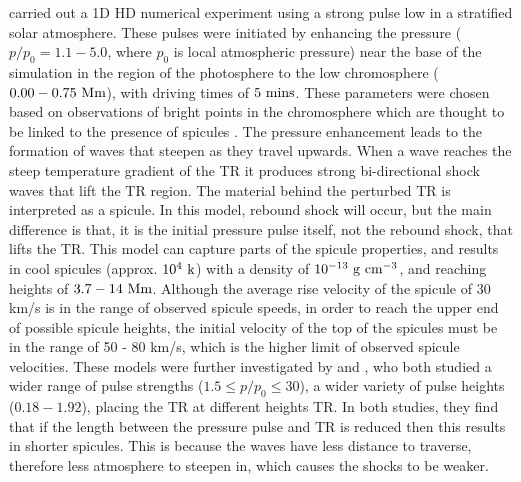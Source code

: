 %
\cite{Suematsu1982SoPh7599S} carried out a 1D HD numerical experiment using a strong pulse low in a stratified solar atmosphere. These pulses were initiated by enhancing the pressure ($p/p_0=1.1-5.0$, where $p_0$ is local atmospheric pressure) near the base of the simulation in the region of the photosphere to the low chromosphere ($0.00-0.75~\rm{Mm}$), with driving times of $5~\rm{mins}$. These parameters were chosen based on observations of bright points in the chromosphere which are thought to be linked to the presence of spicules \citep{Suematsu1995ApJ, Jess2012ApJ744L5J, Oxley_2020ApJ905168O}. The pressure enhancement leads to the formation of waves that steepen as they travel upwards. When a wave reaches the steep temperature gradient of the TR it produces strong bi-directional shock waves that lift the TR region. The material behind the perturbed TR is interpreted as a spicule. In this model, rebound shock will occur, but the main difference is that, it is the initial pressure pulse itself, not the rebound shock, that lifts the TR. This model can capture parts of the spicule properties, and results in cool spicules (approx. $10^4~\rm{k}$) with a density of $10^{-13}~\rm{g~cm^{-3}}$, and reaching heights of $3.7-14~\rm{Mm}$. Although the average rise velocity of the spicule of 30 km/s  is in the range of observed spicule speeds, in order to reach the upper end of possible spicule heights, the initial velocity of the top of the spicules must be in the range of 50 - 80 km/s, which is the higher limit of observed spicule velocities. These models were further investigated by \cite{Shibata1982SoPh78333S} and \cite{Shibata1982}, who both studied a wider range of pulse strengths ($1.5 \le p/p_0 \le 30$), a wider variety of pulse heights ($0.18-1.92$), placing the TR at different heights TR. In both studies, they find that if the length between the pressure pulse and TR is reduced then this results in shorter spicules. This is because the waves have less distance to traverse, therefore less atmosphere to steepen in, which causes the shocks to be weaker. \np
%
